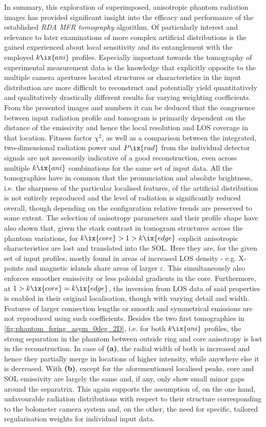                 In summary, this exploration of superimposed, anisotropic phantom radiation images has provided significant insight into the efficacy and performance of the established \textit{RDA MFR tomography} algorithm. Of particularly interest and relevance to later examinations of more complex artificial distributions is the gained experienced about local sensitivity and its entanglement with the employed $k\ix{ani}$ profiles. Especially important towards the tomography of experimental measurement data is the knowledge that explicitly opposite to the multiple camera apertures located structures or characteristics in the input distribution are more difficult to reconstruct and potentially yield quantitatively and qualitatively drastically different results for varying weighting coefficients. From the presented images and numbers it can be deduced that the congruence between input radiation profile and tomogram is primarily dependent on the distance of the emissivity and hence the local resolution and LOS coverage in that location. Fitness factor $\chi^{2}$, as well as a comparison between the integrated, two-dimensional radiation power and $P\ix{rad}$ from the individual detector signals are not necessarily indicative of a good reconstruction, even across multiple $k\ix{ani}$ combinations for the same set of input data. All the tomographies have in common that the pronunciation and absolute brightness, i.e. the sharpness of the particular localised features, of the artificial distribution is not entirely reproduced and the level of radiation is significantly reduced overall, though depending on the configuration relative trends are preserved to some extent. The selection of anisotropy parameters and their profile shape have also shown that, given the stark contrast in tomogram structures across the phantom variations, for $k\ix{core}>1>k\ix{edge}$ explicit anisotropic characteristics are lost and translated into the SOL. Here they are, for the given set of input profiles, mostly found in areas of increased LOS density - e.g. X-points and magnetic islands share areas of larger $\varepsilon$. This simultaneously also enforces smoother emissivity or less poloidal gradients in the core. Furthermore, at $1>k\ix{core}=k\ix{edge}$, the inversion from LOS data of said properties is enabled in their original localisation, though with varying detail and width. Features of larger connection lengths or smooth and symmetrical emissions are not reproduced using such coefficients. Besides the two first tomographies in \cref{fig:phantom_fsring_asym_0deg_2D}, i.e. for both $k\ix{ani}$ profiles, the strong separation in the phantom between outside ring and core anisotropy is lost in the reconstruction. In case of \textbf{(a)}, the radial width of both is increased and hence they partially merge in locations of higher intensity, while anywhere else it is decreased. With \textbf{(b)}, except for the aforementioned localised peaks, core and SOL emissivity are largely the same and, if any, only show small minor gaps around the separatrix. This again supports the assumption of, on the one hand, unfavourable radiation distributions with respect to their structure corresponding to the bolometer camera system and, on the other, the need for specific, tailored regularisation weights for individual input data.\\%
